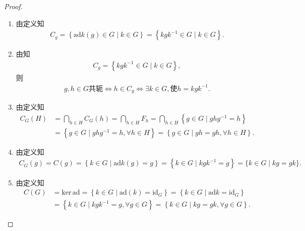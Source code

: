 \documentclass[../../main.tex]{subfiles}%
\begin{document}
\begin{proof}
\begin{enumerate}[(1)]
\item 由定义知
\begin{align*}
C_g=\left\{ \mathrm{ad}k\left( g \right) \in G\mid k\in G \right\} =\left\{ kgk^{-1}\in G\mid k\in G \right\} .
\end{align*}

\item 由知
\begin{align*}
C_g =\left\{ kgk^{-1}\in G\mid k\in G \right\} ,
\end{align*}
则
\begin{align*}
g,h\in G\text{共轭}\Longleftrightarrow h\in C_g\Longleftrightarrow \exists k\in G,\text{使}h=kgk^{-1}.
\end{align*}

\item 由定义知
\begin{align*}
C_G\left( H \right) &=\bigcap_{h\in H}{C_G\left( h \right)}=\bigcap_{h\in H}{F_h}=\bigcap_{h\in H}{\left\{ g\in G\mid ghg^{-1}=h \right\}}\\
&=\left\{ g\in G\mid ghg^{-1}=h,\forall h\in H \right\} =\left\{ g\in G\mid gh=gh,\forall h\in H \right\} .
\end{align*}

\item 由定义知
\begin{align*}
C_G(g)=C(g)=\left\{ k\in G\mid \mathrm{ad}k\left( g \right) =g \right\} =\left\{ k\in G\mid kgk^{-1}=g \right\} =\{k\in G\mid kg=gk\}.
\end{align*}

\item 由定义知
\begin{align*}
C(G)&=\mathrm{ker}\,\mathrm{ad}=\left\{ k\in G\mid \mathrm{ad}\left( k \right) =\mathrm{id}_G \right\} =\left\{ k\in G\mid \mathrm{ad}k=\mathrm{id}_G \right\} 
\\
&=\left\{ k\in G\mid kgk^{-1}=g,\forall g\in G \right\} =\left\{ k\in G\mid kg=gk,\forall g\in G \right\} .
\end{align*}
\end{enumerate}
\end{proof}
\end{document}
